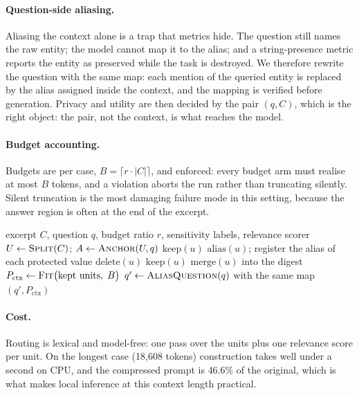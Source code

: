 \documentclass[conference]{IEEEtran}
\newcommand{\ours}{\textsc{PrivTrim}}
\begin{document}
\paragraph{Question-side aliasing.}
Aliasing the context alone is a trap that metrics hide. The question still names the raw
entity; the model cannot map it to the alias; and a string-presence metric reports the entity
as preserved while the task is destroyed. We therefore rewrite the question with the same map:
each mention of the queried entity is replaced by the alias assigned inside the context, and
the mapping is verified before generation. Privacy and utility are then decided by the pair
$(q, C)$, which is the right object: the pair, not the context, is what reaches the model.

\paragraph{Budget accounting.}
Budgets are per case, $B=\lceil r\cdot|C|\rceil$, and enforced: every budget arm must realise at
most $B$ tokens, and a violation aborts the run rather than truncating silently. Silent
truncation is the most damaging failure mode in this setting, because the answer region is
often at the end of the excerpt.

\begin{algorithm}[t]
\caption{\ours{} prompt construction}
\label{alg:privtrim}
\begin{algorithmic}[1]
\Require excerpt $C$, question $q$, budget ratio $r$, sensitivity labels, relevance scorer
\State $U \gets \textsc{Split}(C)$; \quad $A \gets \textsc{Anchor}(U, q)$
   \State $\text{keep}(u)$ 
     \State $\text{alias}(u)$; register the alias of each protected value
   \State $\text{delete}(u)$
   \State $\text{keep}(u)$
  \Else{} \State $\text{merge}(u)$ into the digest
  \EndIf
\EndFor
\State $P_{\text{ctx}} \gets \textsc{Fit}\big(\text{kept units}, \; B\big)$
\State $q' \gets \textsc{AliasQuestion}(q)$ with the same map
\State \Return $(q', P_{\text{ctx}})$
\end{algorithmic}
\end{algorithm}

\paragraph{Cost.}
Routing is lexical and model-free: one pass over the units plus one relevance score per unit.
On the longest case (18{,}608 tokens) construction takes well under a second on CPU, and the
compressed prompt is $46.6\%$ of the original, which is what makes local inference at this
context length practical.
\end{document}
